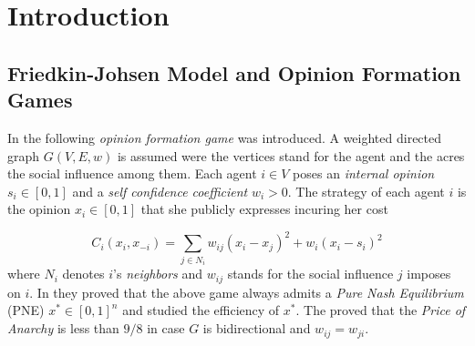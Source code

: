 




\section{Introduction}

\subsection{Friedkin-Johsen Model and Opinion Formation Games}
In \cite{BKO11} the following \emph{opinion formation game} was introduced.
A weighted directed graph $G(V,E,w)$ is assumed were the vertices stand for the
agent and the acres the social influence among them. Each agent $i \in V$ poses an
\emph{internal opinion} $s_i \in [0,1]$ and a \emph{self confidence coefficient} $w_i>0$. The strategy of
each agent $i$ is the opinion $x_i\in [0,1]$ that she publicly expresses incuring her cost

\begin{equation}\label{eq:BKO_cost}
  C_i(x_i,x_{-i}) = \sum_{j \in N_i}w_{ij}(x_i-x_j)^2 + w_i(x_i -s_i)^2
\end{equation}
\noindent where $N_i$ denotes $i$'s \emph{neighbors} and $w_{ij}$ stands for
the social influence $j$ imposes on $i$. In \cite{BKO11} they proved that 
the above game always admits a \emph{Pure Nash Equilibrium} (PNE) $x^* \in [0,1]^n$
and studied the efficiency of $x^*$. The proved that the \emph{Price of Anarchy}
is less than $9/8$ in case $G$ is bidirectional and $w_{ij}=w_{ji}$. 

